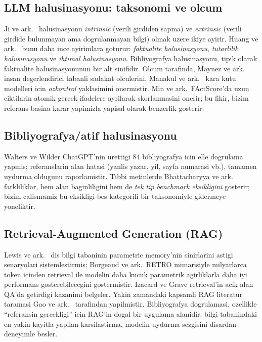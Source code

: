 \documentclass[11pt,a4paper]{article}
\begin{document}
\subsection{LLM halusinasyonu: taksonomi ve olcum}
Ji ve ark.\ \cite{ji2023survey} halusinasyonu \emph{intrinsic} (verili
girdiden sapma) ve \emph{extrinsic} (verili girdide bulunmayan ama dogrulanmayan
bilgi) olmak uzere ikiye ayirir. Huang ve ark.\ \cite{huang2023hallucination}
bunu daha ince ayirimlara goturur: \emph{faktualite halusinasyonu},
\emph{tutarlilik halusinasyonu} ve \emph{ihtimal halusinasyonu}. Bibliyografya
halusinasyonu, tipik olarak faktualite halusinasyonunun bir alt sinifidir.
Olcum tarafinda, Maynez ve ark.\ \cite{maynez2020faithfulness} insan
degerlendirici tabanli sadakat olculerini, Manakul ve ark.\
\cite{manakul2023selfcheckgpt} kara kutu modelleri icin \emph{ozkontrol}
yaklasimini onermistir. Min ve ark.\ FActScore'da \cite{min2023factscore} uzun
ciktilarin atomik gercek ifadelere ayrilarak skorlanmasini onerir; bu fikir,
bizim referans-basina-karar yapimizla yapisal olarak benzerlik gosterir.

\subsection{Bibliyografya/atif halusinasyonu}
Walters ve Wilder \cite{walters2023fabrication} ChatGPT'nin urettigi
84 bibliyografya icin elle dogrulama yapmis; referanslarin %
alan hatasi (yanlis yazar, yil, sayfa numarasi vb.), %
tamamen uydurma oldugunu raporlamistir. Tibbi metinlerde
Bhattacharyya ve ark.\ \cite{bhattacharyya2023high} %
\cite{athaluri2023exploring} %
farkliliklar, hem alan baginliligini hem de \emph{tek tip benchmark
eksikligini} gosterir; bizim calismamiz bu eksikligi bes kategorili bir
taksonomiyle gidermeye yoneliktir.

\subsection{Retrieval-Augmented Generation (RAG)}
Lewis ve ark.\ \cite{lewis2020rag} dis bilgi tabaninin parametric memory'nin
sinirlarini astigi senaryolari sistemlestirmis; Borgeaud ve ark.\ RETRO
mimarisiyle \cite{borgeaud2022retro} milyarlarca token icinden retrieval ile
modelin daha kucuk parametrik agirliklarla daha iyi performans gosterebilecegini
gostermistir. Izacard ve Grave \cite{izacard2021leveraging} retrieval'in
acik alan QA'da getirdigi kazanimi belgeler. Yakin zamandaki kapsamli RAG
literatur taramasi Gao ve ark.\ \cite{gao2024ragsurvey} tarafindan
yapilmistir. Bibliyografya dogrulamasi, ozellikle ``referansin gercekligi'' icin
RAG'in dogal bir uygulama alanidir: bilgi tabanindaki en yakin kayitla yapilan
karsilastirma, modelin uydurma sezgisini disardan deneyimle besler.
\end{document}

